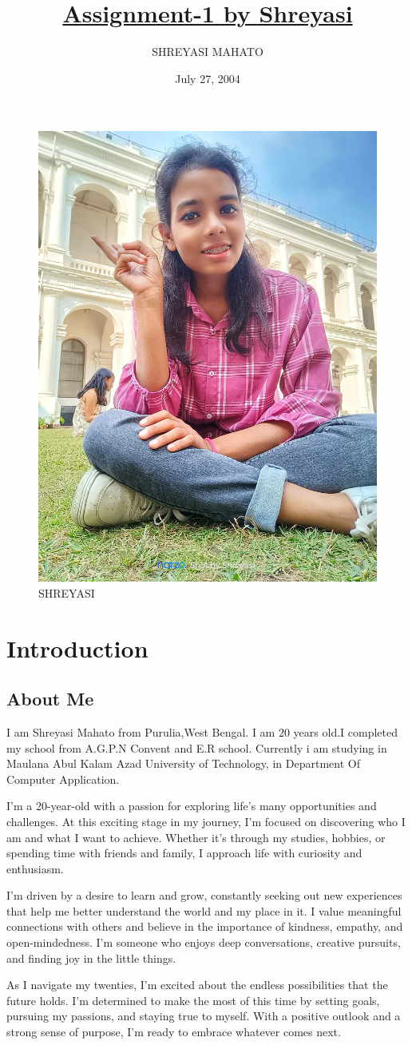 \documentclass{article}
\begin{document}
\title{\underline{{Assignment-1 by Shreyasi}}}
\author{SHREYASI MAHATO}
\date{July 27, 2004}


\maketitle

\begin{figure}[h!]
\centering
    \includegraphics[width=0.25\linewidth]{SHREYASI.jpg}
    \caption{SHREYASI}
    \label{fig:Shreyasi}

\end{figure}
\section{Introduction}

\subsection{About Me}
I am Shreyasi Mahato from Purulia,West Bengal. I am 20 years old.I completed my school from A.G.P.N Convent and E.R school. Currently i am studying in Maulana Abul Kalam Azad University of Technology, in Department Of Computer Application.


I’m a 20-year-old with a passion for exploring life’s many opportunities and challenges. At this exciting stage in my journey, I’m focused on discovering who I am and what I want to achieve. Whether it’s through my studies, hobbies, or spending time with friends and family, I approach life with curiosity and enthusiasm.

I’m driven by a desire to learn and grow, constantly seeking out new experiences that help me better understand the world and my place in it. I value meaningful connections with others and believe in the importance of kindness, empathy, and open-mindedness. I’m someone who enjoys deep conversations, creative pursuits, and finding joy in the little things.

As I navigate my twenties, I’m excited about the endless possibilities that the future holds. I’m determined to make the most of this time by setting goals, pursuing my passions, and staying true to myself. With a positive outlook and a strong sense of purpose, I’m ready to embrace whatever comes next.
\end{document}
